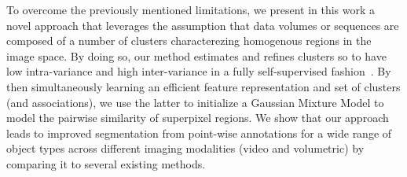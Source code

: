 To overcome the previously mentioned limitations, we present in this work a novel approach that leverages the assumption that data volumes or sequences are composed of a number of clusters characterezing homogenous regions in the image space. By doing so, our method estimates and refines clusters so to have low intra-variance and high inter-variance in a fully self-supervised fashion~\cite{xie15}. By then simultaneously learning an efficient feature representation and set of clusters (and associations), we use the latter to initialize a Gaussian Mixture Model to model the pairwise similarity of superpixel regions. We show that our approach leads to improved segmentation from point-wise annotations for a wide range of object types across different imaging modalities (video and volumetric) by comparing it to several existing methods. 

